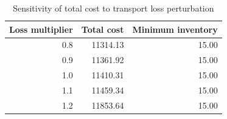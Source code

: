 \begin{table}[H]
\centering
\caption{Sensitivity of total cost to transport loss perturbation}
\label{tab:demo-v1-sensitivity}
\begin{tabular}{rrr}
\toprule
Loss multiplier & Total cost & Minimum inventory \\
\midrule
0.8 & 11314.13 & 15.00 \\
0.9 & 11361.92 & 15.00 \\
1.0 & 11410.31 & 15.00 \\
1.1 & 11459.34 & 15.00 \\
1.2 & 11853.64 & 15.00 \\
\bottomrule
\end{tabular}
\end{table}
